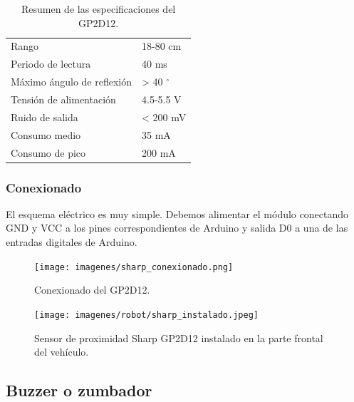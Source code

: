 \begin{table}[H]
  \begin{center}
    \begin{tabular}{|p{8cm}|p{2cm}|}
      \hline
      {Rango} & {18-80 cm}\\
      {Periodo de lectura} & {40 ms}\\
      {Máximo ángulo de reflexión} & {> 40 $^{\circ}$}\\
      {Tensión de alimentación} & {4.5-5.5 V}\\
      {Ruido de salida} & { < 200 mV }\\
      {Consumo medio} & { 35 mA }\\
      {Consumo de pico} & { 200 mA }\\
      \hline
      \end{tabular}
  \end{center}
  \caption{Resumen de las especificaciones del GP2D12.}
\end{table}

\subsubsection{Conexionado}

El esquema eléctrico es muy simple. Debemos alimentar el módulo conectando GND y
VCC a los pines correspondientes de Arduino y salida D0 a una de las entradas digitales
de Arduino.\\

 \begin{figure}[H]
  \begin{center}
    \texttt{[image: imagenes/sharp\_conexionado.png]}
  \end{center}
  \caption{Conexionado del GP2D12.}
  \label{figura:pines_sharp}
\end{figure}


 \begin{figure}[H]
  \begin{center}
    \texttt{[image: imagenes/robot/sharp\_instalado.jpeg]}
  \end{center}
  \caption{Sensor de proximidad Sharp GP2D12 instalado en la parte frontal del vehículo.}
  \label{figura:sensor_mq_2_potenciometro}
\end{figure}


\subsection{Buzzer o zumbador}

